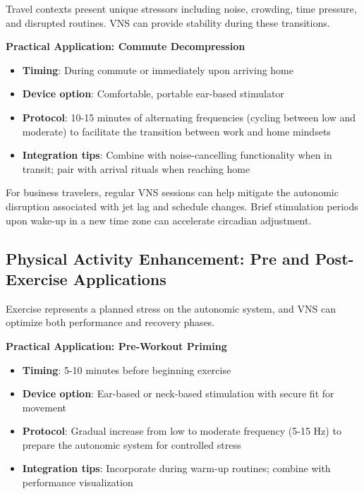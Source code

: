 \documentclass[
  Letterpaper,
]{scrbook}
\providecommand{\tightlist}{%
  \setlength{\itemsep}{0pt}\setlength{\parskip}{0pt}}\usepackage{longtable,booktabs,array}
\begin{document}
Travel contexts present unique stressors including noise, crowding, time
pressure, and disrupted routines. VNS can provide stability during these
transitions.

\textbf{Practical Application: Commute Decompression}

\begin{itemize}
\tightlist
\item
  \textbf{Timing}: During commute or immediately upon arriving home
\item
  \textbf{Device option}: Comfortable, portable ear-based stimulator
\item
  \textbf{Protocol}: 10-15 minutes of alternating frequencies (cycling
  between low and moderate) to facilitate the transition between work
  and home mindsets
\item
  \textbf{Integration tips}: Combine with noise-cancelling functionality
  when in transit; pair with arrival rituals when reaching home
\end{itemize}

For business travelers, regular VNS sessions can help mitigate the
autonomic disruption associated with jet lag and schedule changes. Brief
stimulation periods upon wake-up in a new time zone can accelerate
circadian adjustment.

\subsection{Physical Activity Enhancement: Pre and Post-Exercise
Applications}\label{physical-activity-enhancement-pre-and-post-exercise-applications}

Exercise represents a planned stress on the autonomic system, and VNS
can optimize both performance and recovery phases.

\textbf{Practical Application: Pre-Workout Priming}

\begin{itemize}
\tightlist
\item
  \textbf{Timing}: 5-10 minutes before beginning exercise
\item
  \textbf{Device option}: Ear-based or neck-based stimulation with
  secure fit for movement
\item
  \textbf{Protocol}: Gradual increase from low to moderate frequency
  (5-15 Hz) to prepare the autonomic system for controlled stress
\item
  \textbf{Integration tips}: Incorporate during warm-up routines;
  combine with performance visualization
\end{itemize}
\end{document}
